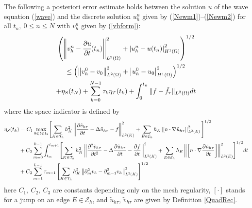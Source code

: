 \documentclass{imanum}
\begin{document}
\begin{theorem}\label{lemest3}
The following a posteriori error estimate holds between the solution $u$ of the wave equation (\ref{wave}) and the discrete solution $u_h^n$ given by (\ref{Newm1})--(\ref{Newm2}) for all $ t_n,~0\leq n\leq N$ with $v_h^n$ given by (\ref{vhform}):
\begin{multline}
\left(\left\Vert v^{n}_h- \cfrac{\partial u}{\partial t} (t_n)\right\Vert_{L^2(\Omega)} ^{2}+\left\vert u^{n}_h-u(t_{n})\right\vert ^{2}_{H^1(\Omega)}\right) ^{1/2}\\
\leq\left(\left\Vert v^{0}_h-v_0\right\Vert_{L^2(\Omega)} ^{2}+\left\vert u^{0}_h-u_0\right\vert ^{2}_{H^1(\Omega)}\right) ^{1/2} \\
+\eta _{S}(t_{N})+\sum_{k=0}^{N-1}\tau_k\eta _{T}(t_{k})
+\int_0^{t_n} \|f-\tilde{f}_\tau\|_{L^2(\Omega)}dt
\label{estf}
\end{multline}
where the space indicator is defined by
\begin{align}
  \eta_S (t_k)
  &= C_1 \max_{0 \leqslant t \leqslant t_k} \Biggl[ \sum_{K \in \mathcal{T}_h}
   h_K^2  \left\Vert \frac{\partial \tilde{v}_{h \tau}}{\partial t} - \Delta \tilde{u}_{h \tau}-f
   \right\Vert_{L^2(K)}^2 + \sum_{
E \in \mathcal{E}_h}h_{E} \left|\left[n \cdot \nabla \tilde{u}_{h
   \tau}\right]\right|_{L^2(E)}^2 \Biggl]^{1/2}
\notag 
\\
\notag &+ C_2\sum_{m = 0}^{k-1} \int_{t_m}^{t_{m + 1}} \Biggl[ \sum_{K \in \mathcal{T}_h} h_K^2
  \left\Vert \frac{\partial^2 \tilde{v}_{h \tau}}{\partial t^2} - \Delta \frac{\partial
  \tilde{u}_{h\tau}}{\partial t} -\frac{\partial{f}}{\partial{t}}\right\Vert_{L^2(K)}^2
  + \sum_{
E \in \mathcal{E}_h}h_{E} \left\Vert\left[n \cdot
  \nabla \frac{\partial \tilde{u}_{h\tau}}{\partial t}\right]\right\Vert_{L^2(E)}^2
  \Biggr]^{1/2}dt
\notag 
\\
&  + C_3\sum_{m = 1}^{k-1} {\tau_{m - 1}} \left[ \sum_{K \in \mathcal{T}_h} h_K^2 \left\Vert \partial_m^2 v_h -
  \partial_{m - 1}^2 v_h \right\Vert_{L^2(K)}^2 \right]^{1/2}\label{space}
\end{align}
here  $C_1,~C_2,~C_3$ are constants depending only on the mesh regularity,
$[\cdot]$ stands for a jump on an edge $E\in\mathcal{E}_h$, and 
$\tilde{u}_{h\tau}$, $\tilde{v}_{h\tau}$ are given by Definition \ref{QuadRec}. 


\end{theorem}
\end{document}
